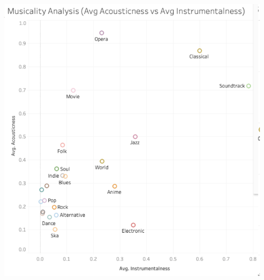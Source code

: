 \documentclass[
]{article}
\begin{document}
\begin{center}\includegraphics[width=0.7\linewidth]{Screen Shot 2020-11-23 at 11.34.30 PM} \end{center}
\end{document}
